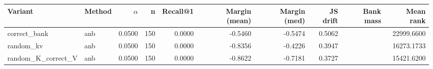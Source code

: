 \begin{tabular}{l l r r r r r r r r}
\toprule
Variant & Method & $\alpha$ & n & Recall@1 & Margin (mean) & Margin (med) & JS drift & Bank mass & Mean rank \\
\midrule
correct\_bank & anb & 0.0500 & 150 & 0.0000 & -0.5460 & -0.5474 & 0.5062 &  & 22999.6600 \\
random\_kv & anb & 0.0500 & 150 & 0.0000 & -0.8356 & -0.4226 & 0.3947 &  & 16273.1733 \\
random\_K\_correct\_V & anb & 0.0500 & 150 & 0.0000 & -0.8622 & -0.7181 & 0.3727 &  & 15421.6200 \\
\bottomrule
\end{tabular}
